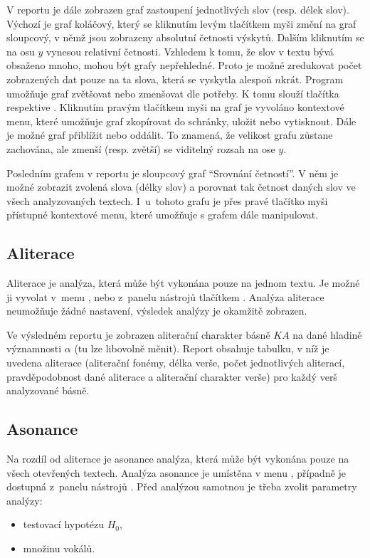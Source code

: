 \documentclass[dp.tex]{subfiles}
\begin{document}
V reportu je dále zobrazen graf zastoupení jednotlivých slov (resp. délek slov). Výchozí je graf koláčový, který se kliknutím levým tlačítkem myši změní na graf sloupcový, v němž jsou zobrazeny absolutní četnosti výskytů. Dalším kliknutím se na osu $y$ vynesou relativní četnosti. Vzhledem k tomu, že slov v textu bývá obsaženo mnoho, mohou být grafy nepřehledné. Proto je možné zredukovat počet zobrazených dat pouze na ta slova, která se vyskytla alespoň $n\text{krát}$. Program umožňuje graf zvětšovat nebo zmenšovat dle potřeby. K tomu slouží tlačítka  respektive . Kliknutím pravým tlačítkem myši na graf je vyvoláno kontextové menu, které umožňuje graf zkopírovat do schránky, uložit nebo vytisknout. Dále je možné graf přiblížit nebo oddálit. To znamená, že velikost grafu zůstane zachována, ale zmenší (resp. zvětší) se viditelný rozsah na ose $y$.

Posledním grafem v reportu je sloupcový graf \enquote{Srovnání četností}. V něm je možné zobrazit zvolená slova (délky slov) a porovnat tak četnost daných slov ve všech analyzovaných textech. I~u~tohoto grafu je přes pravé tlačítko myši přístupné kontextové menu, které umožňuje s grafem dále manipulovat.

\subsection{Aliterace}

Aliterace je analýza, která může být vykonána pouze na jednom textu. Je možné ji vyvolat v~menu , nebo z~panelu nástrojů tlačítkem . Analýza aliterace neumožňuje žádné nastavení, výsledek analýzy je okamžitě zobrazen. 

Ve výsledném reportu je zobrazen aliterační charakter básně $\mathit{KA}$ na dané hladině významnosti $\alpha$ (tu lze libovolně měnit). Report obsahuje tabulku, v níž je uvedena aliterace (aliterační fonémy, délka verše, počet jednotlivých aliterací, pravděpodobnost dané aliterace a aliterační charakter verše) pro každý verš analyzované básně.
	
\subsection{Asonance}
\label{chap:app_asonance}
Na rozdíl od aliterace je asonance analýza, která může být vykonána pouze na všech otevřených textech. Analýza asonance je umístěna v menu , případně je dostupná z~panelu nástrojů . Před analýzou samotnou je třeba zvolit parametry analýzy:
\begin{itemize}
\item testovací hypotézu $H_0$,
\item množinu vokálů.
\end{itemize}
\end{document}
